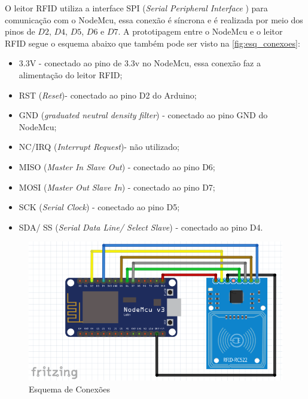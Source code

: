 \par
O leitor RFID utiliza a interface SPI (\textit{Serial Peripheral Interface} ) para comunicação com o NodeMcu,
essa conexão é síncrona e é realizada por meio dos pinos de $D2$, $D4$, $D5$, $D6$ e $D7$. A prototipagem entre o NodeMcu e o leitor RFID
segue o esquema abaixo que também pode ser visto na \autoref{fig:esq_conexoes}:

\begin{itemize}
    \item 3.3V - conectado ao pino de 3.3v no NodeMcu, essa conexão faz a alimentação do leitor RFID;
    \item RST (\textit{Reset})- conectado ao pino D2 do Arduino;
    \item GND (\textit{graduated neutral density filter}) - conectado ao pino GND do NodeMcu;
    \item NC/IRQ (\textit{Interrupt Request})- não utilizado;
    \item MISO (\textit{Master In Slave Out}) - conectado ao pino D6;
    \item MOSI  (\textit{Master Out Slave In}) - conectado ao pino D7;
    \item SCK  (\textit{Serial Clock}) - conectado ao pino D5;
    \item SDA/ SS (\textit{Serial Data Line/ Select Slave}) - conectado ao pino D4.
\end{itemize}

\begin{figure}[H]
              \caption{\label{fig:esq_conexoes}{Esquema de Conexões}}
              \centering
              \includegraphics[width=1\textwidth]{Figuras/esquema_nodemcu_rc522.PNG}
\end{figure}

